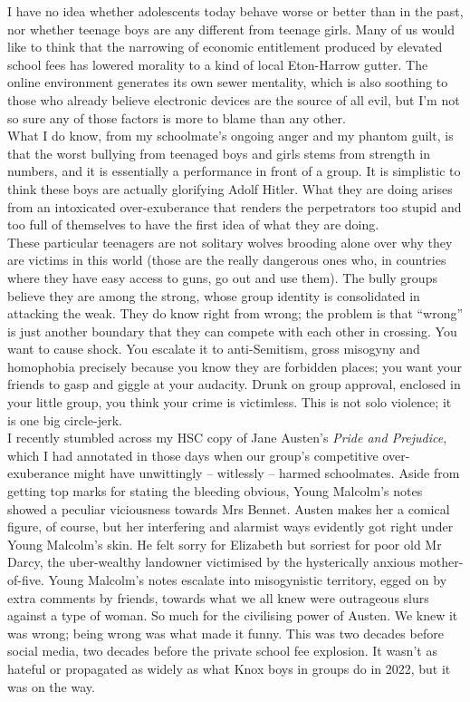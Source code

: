 \documentclass[a4paper]{article}
\begin{document}
I have no idea whether adolescents today behave worse or better than in the past, nor whether teenage boys are any different from teenage girls. Many of us would like to think that the narrowing of economic entitlement produced by elevated school fees has lowered morality to a kind of local Eton-Harrow gutter. The online environment generates its own sewer mentality, which is also soothing to those who already believe electronic devices are the source of all evil, but I’m not so sure any of those factors is more to blame than any other.\\

What I do know, from my schoolmate’s ongoing anger and my phantom guilt, is that the worst bullying from teenaged boys and girls stems from strength in numbers, and it is essentially a performance in front of a group. It is simplistic to think these boys are actually glorifying Adolf Hitler. What they are doing arises from an intoxicated over-exuberance that renders the perpetrators too stupid and too full of themselves to have the first idea of what they are doing.\\

These particular teenagers are not solitary wolves brooding alone over why they are victims in this world (those are the really dangerous ones who, in countries where they have easy access to guns, go out and use them). The bully groups believe they are among the strong, whose group identity is consolidated in attacking the weak. They do know right from wrong; the problem is that ``wrong'' is just another boundary that they can compete with each other in crossing. You want to cause shock. You escalate it to anti-Semitism, gross misogyny and homophobia precisely because you know they are forbidden places; you want your friends to gasp and giggle at your audacity. Drunk on group approval, enclosed in your little group, you think your crime is victimless. This is not solo violence; it is one big circle-jerk.\\

I recently stumbled across my HSC copy of Jane Austen’s \textit{Pride and Prejudice}, which I had annotated in those days when our group’s competitive over-exuberance might have unwittingly – witlessly – harmed schoolmates. Aside from getting top marks for stating the bleeding obvious, Young Malcolm’s notes showed a peculiar viciousness towards Mrs Bennet. Austen makes her a comical figure, of course, but her interfering and alarmist ways evidently got right under Young Malcolm’s skin. He felt sorry for Elizabeth but sorriest for poor old Mr Darcy, the uber-wealthy landowner victimised by the hysterically anxious mother-of-five. Young Malcolm’s notes escalate into misogynistic territory, egged on by extra comments by friends, towards what we all knew were outrageous slurs against a type of woman. So much for the civilising power of Austen. We knew it was wrong; being wrong was what made it funny. This was two decades before social media, two decades before the private school fee explosion. It wasn’t as hateful or propagated as widely as what Knox boys in groups do in 2022, but it was on the way.\\
\end{document}
